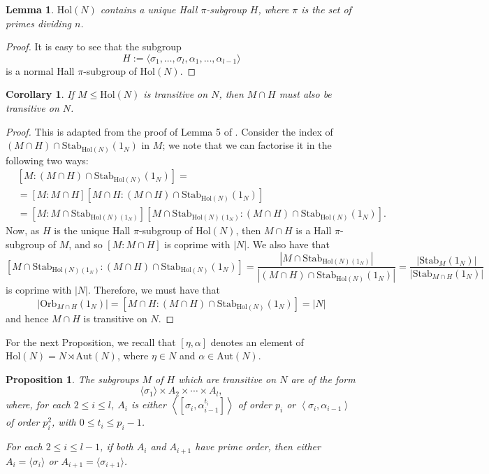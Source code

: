 \documentclass[a4paper,reqno]{amsart}
\newtheorem{proposition}[theorem]{Proposition}
\newtheorem{lemma}[theorem]{Lemma}
\newtheorem{corollary}[theorem]{Corollary}
\theoremstyle{definition}
\newcommand{\Aut}{\mathrm{Aut}}
\newcommand{\Hol}{\mathrm{Hol}}
\begin{document}
\begin{lemma}
    $\Hol(N)$ contains a unique Hall $\pi$-subgroup $H$, where $\pi$ is the set of primes dividing $n$.
\end{lemma}
\begin{proof}
    It is easy to see that the subgroup
    \[H:=\langle \sigma_1,\ldots, \sigma_l, \alpha_1,\ldots,\alpha_{l-1} \rangle\]
    is a normal Hall $\pi$-subgroup of $\Hol(N)$.
\end{proof}
\begin{corollary}
    If $M\leq\Hol(N)$ is transitive on $N$, then $M\cap H$ must also be transitive on $N$.
\end{corollary}
\begin{proof}
    This is adapted from the proof of Lemma 5 of \cite{Cre22}. Consider the index of $(M \cap H) \cap \mathrm{Stab}_{\Hol(N)}(1_N)$ in $M$; we note that we can factorise it in the following two ways:
    \begin{align*}
        &[M:(M \cap H) \cap \mathrm{Stab}_{\Hol(N)}(1_N)] =\\
        &=[M:M \cap H][M \cap H: (M \cap H) \cap \mathrm{Stab}_{\Hol(N)}(1_N)]\\
        &=[M:M \cap \mathrm{Stab}_{\Hol(N)(1_N)}][M \cap \mathrm{Stab}_{\Hol(N)(1_N)}:(M \cap H) \cap \mathrm{Stab}_{\Hol(N)}(1_N)].
    \end{align*}
    Now, as $H$ is the unique Hall $\pi$-subgroup of $\Hol(N)$, then $M \cap H$ is a Hall $\pi$-subgroup of $M$, and so $[M:M \cap H]$ is coprime with $|N|$. We also have that
    \[[M \cap \mathrm{Stab}_{\Hol(N)(1_N)}:(M \cap H) \cap \mathrm{Stab}_{\Hol(N)}(1_N)]=\frac{|M \cap \mathrm{Stab}_{\Hol(N)(1_N)}|}{|(M \cap H) \cap \mathrm{Stab}_{\Hol(N)}(1_N)|}=\frac{|\mathrm{Stab}_M(1_N)|}{|\mathrm{Stab}_{M \cap H}(1_N)|}\]
    is coprime with $|N|$. Therefore, we must have that
    \[|\mathrm{Orb}_{M \cap H}(1_N)|=[M \cap H: (M \cap H) \cap \mathrm{Stab}_{\Hol(N)}(1_N)]=|N|\]
    and hence $M \cap H$ is transitive on $N$.
\end{proof}
For the next Proposition, we recall that $[\eta,\alpha]$ denotes an element of $\Hol(N)=N \rtimes \Aut(N)$, where $\eta \in N$ and $\alpha \in \Aut(N)$.
\begin{proposition}\label{H_subgroups}
    The subgroups $M$ of $H$ which are transitive on $N$ are of the form
    \[\langle \sigma_1 \rangle \times A_2 \times \cdots \times A_l,\]
    where, for each $2 \leq i\leq l$, $A_i$ is either $\left\langle \left[\sigma_i,\alpha_{i-1}^{t_i}\right] \right\rangle$ of order $p_i$ or $\left\langle \sigma_i,\alpha_{i-1} \right\rangle$ of order $p_i^2$, with $0\leq t_i \leq p_i-1$.
    
    For each $2 \leq i \leq l-1$, if both $A_i$ and $A_{i+1}$ have prime order, then either $A_i=\langle \sigma_i \rangle$ or $A_{i+1}=\langle \sigma_{i+1} \rangle$.
\end{proposition}
\end{document}
